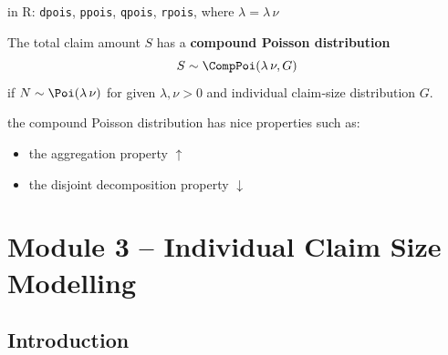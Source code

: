 \documentclass[11pt]{article}
\newcommand{\noi}{\noindent}
\begin{document}
\noi in R: \texttt{dpois}, \texttt{ppois}, \texttt{qpois}, \texttt{rpois}, where \(\lambda = \lambda\,\nu\)

\noi The total claim amount \(S\) has a \textbf{compound Poisson distribution}
\[
S \sim \CompPoi(\lambda\,\nu, G)
\]
if \(N\sim\Poi(\lambda\,\nu)\) for given \(\lambda,\nu>0\) and individual claim‐size distribution \(G\).

\noi the compound Poisson distribution has nice properties such as:
\begin{itemize}
  \item the aggregation property \(\uparrow\)
  \item the disjoint decomposition property \(\downarrow\)
\end{itemize}








\newpage
\section{Module 3 – Individual Claim Size Modelling}

\subsection{Introduction}
\end{document}
